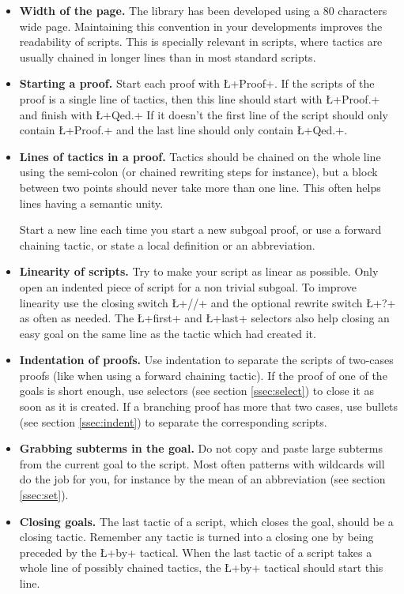 \begin{itemize}
\item {\bf Width of the page.} The library has been developed using a
  80 characters wide page. Maintaining this convention in your
  developments improves the readability of scripts. This is specially
  relevant in \ssr{} scripts, where tactics are usually chained in
  longer lines than in most standard \Coq{} scripts.

\item{\bf Starting a proof.} Start each proof with
  \L+Proof+. If the scripts of the proof is a single line of tactics,
  then this line should start with \L+Proof.+ and finish with \L+Qed.+
  If it doesn't the first line of the script should only contain
  \L+Proof.+ and the last line should only contain \L+Qed.+.


\item {\bf Lines of tactics in a proof.} Tactics should be chained on
  the whole line using the semi-colon (or chained rewriting steps for
  instance), but a block between two points should never take more
  than one line. This often helps lines having a semantic unity.

  Start a new line each time you start a new subgoal
  proof, or use a forward chaining tactic, or state a local definition
  or an abbreviation.

\item{\bf Linearity of scripts.} Try to make your script as linear as
  possible. Only open an indented piece of script for a non trivial
  subgoal. To improve linearity use the closing switch \L+//+ and the
  optional rewrite switch \L+?+ as often as needed. The
  \L+first+ and \L+last+ selectors also help closing an easy goal on the
  same line as the tactic which had created it.

\item {\bf Indentation of proofs.} Use indentation to separate the
  scripts of two-cases proofs (like when using a forward
  chaining tactic). If the proof of one of the goals is short enough,
  use selectors (see section \ref{ssec:select}) to close it as soon
  as it is created. If a branching proof has more that two cases,
  use bullets (see section \ref{ssec:indent}) to separate the
  corresponding scripts.

\item{\bf Grabbing subterms in the goal. } Do not copy and paste large
  subterms from the current goal to the script. Most often patterns
  with wildcards
  will do the job for you, for instance by the mean of an abbreviation
  (see section \ref{ssec:set}).

\item {\bf Closing goals.} The last tactic of a script, which  closes
  the goal, should be a closing tactic. Remember any tactic is turned
  into a closing one by being preceded by the \L+by+ tactical. When
  the last tactic of a script takes a whole line of possibly chained
  tactics, the \L+by+ tactical should start this line.


\end{itemize}

